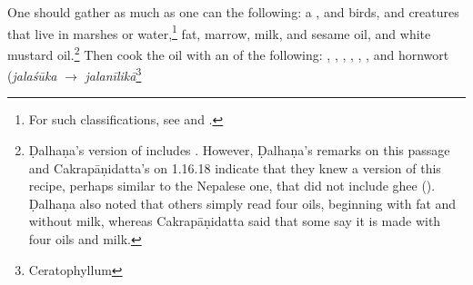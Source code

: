 \begin{translation}
    One should gather as much as one can the following: a
    , %
     and  birds, and
    creatures that live in marshes or water,\footnote{For such classifications,
    see \citet{zimm-1999} and \citet{smit-1994}.} fat, marrow, milk, and sesame oil, and
    white mustard oil.\footnote{Ḍalhaṇa's version of  includes 
    . However, Ḍalhaṇa's remarks on this passage and Cakrapāṇidatta's on 
    1.16.18 \citep[130]{acar-1939} indicate that they knew a version of this recipe, perhaps 
    similar to the Nepalese one, that did not include ghee (). Ḍalhaṇa also noted that others 
    simply read four oils, beginning with fat and without milk, whereas Cakrapāṇidatta said 
    that some say it is made with four oils and milk.}
Then cook the oil with an  of the following:
    , %
    , %
    , %
    , %
    , %
    , %
     and
    hornwort (\emph{jalaśūka} $\rightarrow$ \emph{jalanīlikā}\footnote{Ceratophyllum
}
\end{translation}
